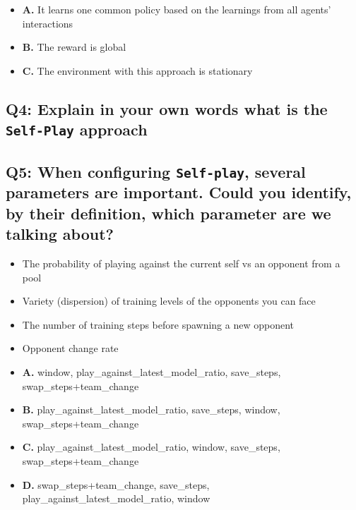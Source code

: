 \documentclass[11pt,a4paper]{article}
\begin{document}
\begin{itemize}
\tightlist
\item
  \textbf{A.} It learns one common policy based on the learnings from all agents' interactions
\item
  \textbf{B.} The reward is global
\item
  \textbf{C.} The environment with this approach is stationary
\end{itemize}

\subsection{\texorpdfstring{Q4: Explain in your own words what is the \texttt{Self-Play} approach}{Q4: Explain in your own words what is the Self-Play approach}}\label{q4-explain-in-your-own-words-what-is-the-self-play-approach}

\subsection{\texorpdfstring{Q5: When configuring \texttt{Self-play}, several parameters are important. Could you identify, by their definition, which parameter are we talking about?}{Q5: When configuring Self-play, several parameters are important. Could you identify, by their definition, which parameter are we talking about?}}\label{q5-when-configuring-self-play-several-parameters-are-important.-could-you-identify-by-their-definition-which-parameter-are-we-talking-about}

\begin{itemize}
\item
  The probability of playing against the current self vs an opponent from a pool
\item
  Variety (dispersion) of training levels of the opponents you can face
\item
  The number of training steps before spawning a new opponent
\item
  Opponent change rate
\item
  \textbf{A.} window, play\_against\_latest\_model\_ratio, save\_steps, swap\_steps+team\_change
\item
  \textbf{B.} play\_against\_latest\_model\_ratio, save\_steps, window, swap\_steps+team\_change
\item
  \textbf{C.} play\_against\_latest\_model\_ratio, window, save\_steps, swap\_steps+team\_change
\item
  \textbf{D.} swap\_steps+team\_change, save\_steps, play\_against\_latest\_model\_ratio, window
\end{itemize}
\end{document}
